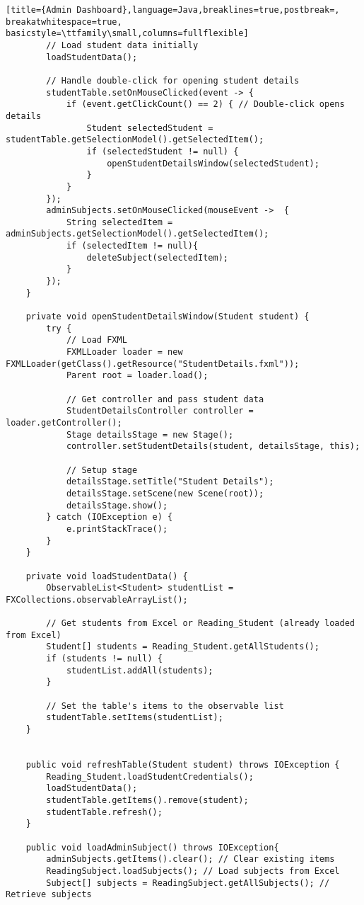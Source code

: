\begin{lstlisting}[title={Admin Dashboard},language=Java,breaklines=true,postbreak=, breakatwhitespace=true, basicstyle=\ttfamily\small,columns=fullflexible]
        // Load student data initially
        loadStudentData();

        // Handle double-click for opening student details
        studentTable.setOnMouseClicked(event -> {
            if (event.getClickCount() == 2) { // Double-click opens details
                Student selectedStudent = studentTable.getSelectionModel().getSelectedItem();
                if (selectedStudent != null) {
                    openStudentDetailsWindow(selectedStudent);
                }
            }
        });
        adminSubjects.setOnMouseClicked(mouseEvent ->  {
            String selectedItem = adminSubjects.getSelectionModel().getSelectedItem();
            if (selectedItem != null){
                deleteSubject(selectedItem);
            }
        });
    }

    private void openStudentDetailsWindow(Student student) {
        try {
            // Load FXML
            FXMLLoader loader = new FXMLLoader(getClass().getResource("StudentDetails.fxml"));
            Parent root = loader.load();

            // Get controller and pass student data
            StudentDetailsController controller = loader.getController();
            Stage detailsStage = new Stage();
            controller.setStudentDetails(student, detailsStage, this);

            // Setup stage
            detailsStage.setTitle("Student Details");
            detailsStage.setScene(new Scene(root));
            detailsStage.show();
        } catch (IOException e) {
            e.printStackTrace();
        }
    }

    private void loadStudentData() {
        ObservableList<Student> studentList = FXCollections.observableArrayList();

        // Get students from Excel or Reading_Student (already loaded from Excel)
        Student[] students = Reading_Student.getAllStudents();
        if (students != null) {
            studentList.addAll(students);
        }

        // Set the table's items to the observable list
        studentTable.setItems(studentList);
    }


    public void refreshTable(Student student) throws IOException {
        Reading_Student.loadStudentCredentials();
        loadStudentData();
        studentTable.getItems().remove(student);
        studentTable.refresh();
    }

    public void loadAdminSubject() throws IOException{
        adminSubjects.getItems().clear(); // Clear existing items
        ReadingSubject.loadSubjects(); // Load subjects from Excel
        Subject[] subjects = ReadingSubject.getAllSubjects(); // Retrieve subjects


\end{lstlisting}
